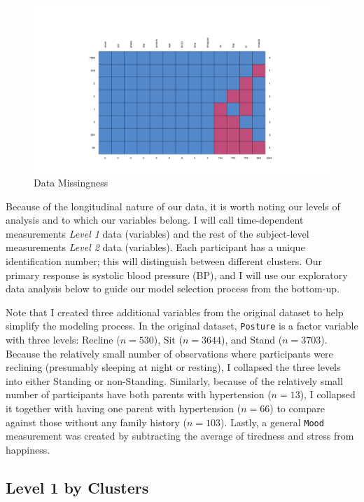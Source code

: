 \documentclass[12pt,twoside,leqno,fleqn,letterpaper]{article}
\theoremstyle{definition}
\theoremstyle{definition}
\begin{document}
\begin{figure}
\centering
\includegraphics[width=\textwidth]{pics/miss.png}
\caption{Data Missingness}
\label{fig: missing}
\end{figure}

Because of the longitudinal nature of our data, it is worth noting our levels of analysis and to which our variables belong. I will call time-dependent measurements \emph{\textcolor[RGB]{208, 2, 27}{Level 1}} data (variables) and the rest of the subject-level measurements \emph{\textcolor[RGB]{74, 144, 226}{Level 2}} data (variables). Each participant has a unique identification number; this will distinguish between different clusters. Our primary response is systolic blood pressure (BP), and I will use our exploratory data analysis below to guide our model selection process from the bottom-up.

Note that I created three additional variables from the original dataset to help simplify the modeling process. In the original dataset, \texttt{Posture} is a factor variable with three levels: Recline ($n = 530$), Sit ($n = 3644$), and Stand ($n = 3703$). Because the relatively small number of observations where participants were reclining (presumably sleeping at night or resting), I collapsed the three levels into either Standing or non-Standing. Similarly, because of the relatively small number of participants have both parents with hypertension ($n = 13$), I collapsed it together with having one parent with hypertension ($n = 66$) to compare against those without any family history ($n = 103$). Lastly, a general \texttt{Mood} measurement was created by subtracting the average of tiredness and stress from happiness. 

\subsection{Level 1 by Clusters}
\end{document}
